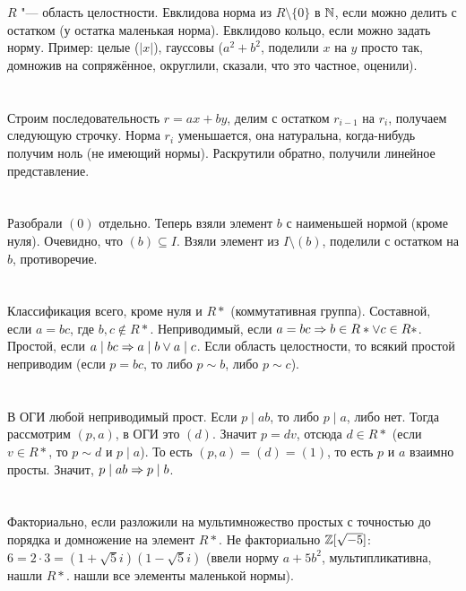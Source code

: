 \section{} %
$R$ "--- область целостности.
Евклидова норма из $R \setminus \{0\}$ в $\mathbb{N}$, если можно делить с остатком (у остатка маленькая норма).
Евклидово кольцо, если можно задать норму.
Пример: целые ($|x|$), гауссовы ($a^2+b^2$, поделили $x$ на $y$ просто так, домножив на сопряжённое, округлили, сказали, что это частное, оценили).

\section{} %
Строим последовательность $r=ax+by$, делим с остатком $r_{i-1}$ на $r_i$, получаем следующую строчку.
Норма $r_i$ уменьшается, она натуральна, когда-нибудь получим ноль (не имеющий нормы).
Раскрутили обратно, получили линейное представление.

\section{} %
Разобрали $(0)$ отдельно.
Теперь взяли элемент $b$ с наименьшей нормой (кроме нуля).
Очевидно, что $(b) \subseteq I$.
Взяли элемент из $I \setminus (b)$, поделили с остатком на $b$, противоречие.

\section{} %
Классификация всего, кроме нуля и $R*$ (коммутативная группа).
Составной, если $a=bc$, где $b, c \notin R*$.
Неприводимый, если $a=bc \Rightarrow b \in R* \lor c \in R*$.
Простой, если $a \mid bc \Rightarrow a \mid b \lor a \mid c$.
Если область целостности, то всякий простой неприводим (если $p=bc$, то либо $p\sim b$, либо $p\sim c$).

\section{} %
В ОГИ любой неприводимый прост.
Если $p \mid ab$, то либо $p \mid a$, либо нет.
Тогда рассмотрим $(p,a)$, в ОГИ это $(d)$.
Значит $p=dv$, отсюда $d \in R*$ (если $v \in R*$, то $p \sim d$ и $p \mid a$).
То есть $(p,a)=(d)=(1)$, то есть $p$ и $a$ взаимно просты.
Значит, $p \mid ab \Rightarrow p \mid b$.

\section{} %
Факториально, если разложили на мультимножество простых с точностью до порядка и домножение на элемент $R*$.
Не факториально $\mathbb{Z}[\sqrt{-5}]$: $6=2\cdot 3 = (1+\sqrt 5 i)(1 - \sqrt 5 i)$ (ввели норму $a+5b^2$, мультипликативна, нашли $R*$. нашли все элементы маленькой нормы).

